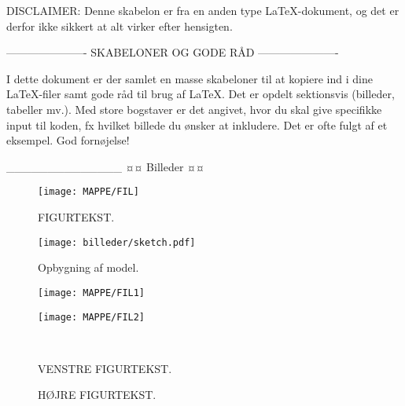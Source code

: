 DISCLAIMER: Denne skabelon er fra en anden type LaTeX-dokument, og det er derfor ikke sikkert at alt virker efter hensigten.

----------------------
SKABELONER OG GODE RÅD
----------------------

I dette dokument er der samlet en masse skabeloner til at kopiere ind i dine LaTeX-filer samt gode råd til brug af LaTeX. Det er opdelt sektionsvis (billeder, tabeller mv.). Med store bogstaver er det angivet, hvor du skal give specifikke input til koden, fx hvilket billede du ønsker at inkludere. Det er ofte fulgt af et eksempel. God fornøjelse!

______________
¤¤ Billeder ¤¤


\begin{figure}[H] %
	\centering
	\texttt{[image: MAPPE/FIL]}
	\caption{FIGURTEKST.}
	\label{figur:LABEL}
\end{figure}

\begin{figure}[H]
	\centering
	\texttt{[image: billeder/sketch.pdf]}
	\caption{Opbygning af model.}
	\label{fig:sketch}
\end{figure}

\begin{figure}[H]
	\centering
	\begin{minipage}[b]{0.48\textwidth}
	\centering
	\texttt{[image: MAPPE/FIL1]} %
	\end{minipage}
	\hfill
	\begin{minipage}[b]{0.48\textwidth}
	\centering
	\texttt{[image: MAPPE/FIL2]} %
	\end{minipage}
	\\ %
	\begin{minipage}[t]{0.48\textwidth}
	\caption{VENSTRE FIGURTEKST.} %
	\label{fig:LABEL1}
	\end{minipage}
	\hfill
	\begin{minipage}[t]{0.48\textwidth}
	\caption{HØJRE FIGURTEKST.} %
	\label{fig:LABEL2}
	\end{minipage}
\end{figure}

